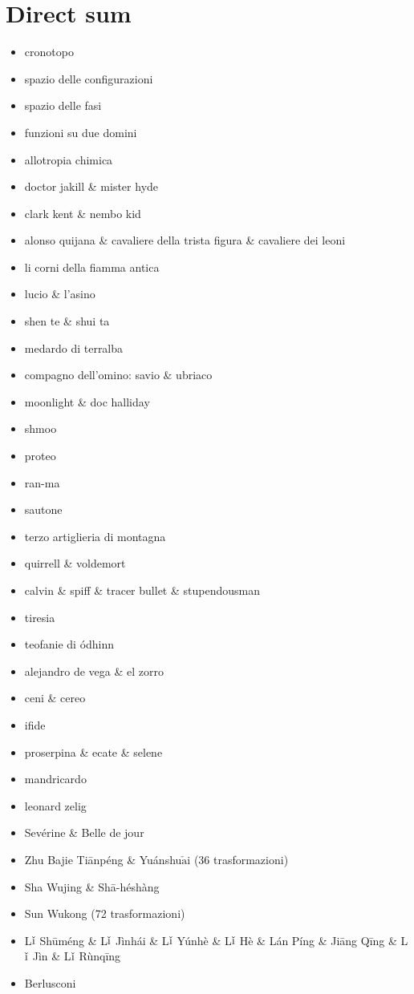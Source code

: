 \documentclass[danish,a4paper,12pt]{article}
\begin{document}
\section*{Direct sum}
\begin{itemize}
\item[] cronotopo
\item[] spazio delle configurazioni
\item[] spazio delle fasi
\item[] funzioni su due domini
\item[] allotropia chimica
\item[] doctor jakill \& mister hyde
\item[] clark kent \& nembo kid
\item[] alonso quijana \& cavaliere della trista figura \& cavaliere dei
leoni
\item[] li corni della fiamma antica
\item[] lucio \& l'asino
\item[] shen te \& shui ta
\item[] medardo di terralba
\item[] compagno dell'omino: savio \& ubriaco
\item[] moonlight \& doc halliday
\item[] shmoo
\item[] proteo
\item[] ran-ma
\item[] sautone
\item[] terzo artiglieria di montagna
\item[] quirrell \& voldemort
\item[] calvin \& spiff \& tracer bullet \& stupendousman
\item[] tiresia
\item[] teofanie di ódhinn
\item[] alejandro de vega \& el zorro
\item[] ceni \& cereo
\item[] ifide
\item[] proserpina \& ecate \& selene
\item[] mandricardo
\item[] leonard zelig
\item[] Sevérine \& Belle de jour
\item[] Zhu Bajie Tiānpéng \& Yuánshu$\check{\text{a}}$i (36 trasformazioni)
\item[] Sha Wujing \& Shā-héshàng
\item[] Sun Wukong (72 trasformazioni)
\item[] L$\check{\text{\i}}$ Sh\=uméng \& L$\check{\text{\i}}$ Jìnhái \& L$\check{\text{\i}}$ Yúnhè \& L$\check{\text{\i}}$ Hè \& Lán Píng \&
Jiāng Qīng \& L$\check{\text{\i}}$ Jìn \& L$\check{\text{\i}}$ Rùnqīng
\item[] Berlusconi
\end{itemize}
\end{document}
